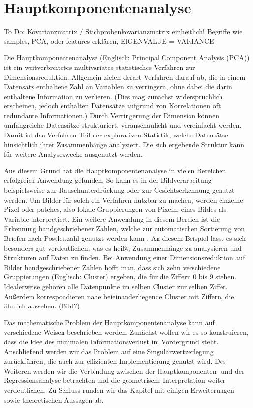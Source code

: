 \chapter{Hauptkomponentenanalyse}

\label{pca}

To Do: Kovarianzmatrix / Stichprobenkovarianzmatrix einheitlich!
Begriffe wie samples, PCA, oder features erklären, EIGENVALUE = VARIANCE

Die Hauptkomponentenanalyse (Englisch: Principal Component Analysis (PCA)) ist ein weitverbreitetes multivariates statistisches Verfahren zur Dimensionsreduktion. Allgemein zielen derart Verfahren darauf ab, die in einem Datensatz enthaltene Zahl an Variablen zu verringern, ohne dabei die darin enthaltene Information zu verlieren. (Dies mag zunächst widersprüchlich erscheinen, jedoch enthalten Datensätze aufgrund von Korrelationen oft redundante Informationen.) Durch Verringerung der Dimension können umfangreiche Datensätze strukturiert, veranschaulicht und vereinfacht werden. Damit ist das Verfahren Teil der explorativen Statistik, welche Datensätze hinsichtlich ihrer Zusammenhänge analysiert. Die sich ergebende Struktur kann für weitere Analysezwecke ausgenutzt werden.

Aus diesem Grund hat die Hauptkomponentenanalyse in vielen Bereichen erfolgreich Anwendung gefunden. So kann es in der Bildverarbeitung beispielsweise zur Rauschunterdrückung \cite{babu} oder zur Gesichtserkennung \cite{jiang} genutzt werden. Um Bilder für solch ein Verfahren nutzbar zu machen, werden einzelne Pixel oder patches, also lokale Gruppierungen von Pixeln, eines Bildes als Variable interpretiert. Ein weitere Anwendung in diesem Bereich ist die Erkennung handgeschriebener Zahlen, welche zur automatischen Sortierung von Briefen nach Postleitzahl genutzt werden kann \cite{hastie_elements}. An diesem Beispiel lässt es sich besonders gut verdeutlichen, was es heißt, Zusammenhänge zu analysieren und Strukturen auf Daten zu finden. Bei Anwendung einer Dimensionsreduktion auf Bilder handgeschriebener Zahlen hofft man, dass sich zehn verschiedene Gruppierungen (Englisch: Cluster) ergeben, die für die Ziffern 0 bis 9 stehen. Idealerweise gehören alle Datenpunkte im selben Cluster zur selben Ziffer. Außerdem korrespondieren nahe beieinanderliegende Cluster mit Ziffern, die ähnlich aussehen. (Bild?)

Das mathematische Problem der Hauptkomponentenanalyse kann auf verschiedene Weisen beschrieben werden. Zunächst wollen wir es so konstruieren, dass die Idee des minimalen Informationsverlust im Vordergrund steht. Anschließend werden wir das Problem auf eine Singulärwertzerlegung zurückführen, die auch zur effizienten Implementierung genutzt wird. Des Weiteren werden wir die Verbindung zwischen der Hauptkomponenten- und der Regressionsanalyse betrachten und die geometrische Interpretation weiter verdeutlichen. Zu Schluss runden wir das Kapitel mit einigen Erweiterungen sowie theoretischen Aussagen ab.

